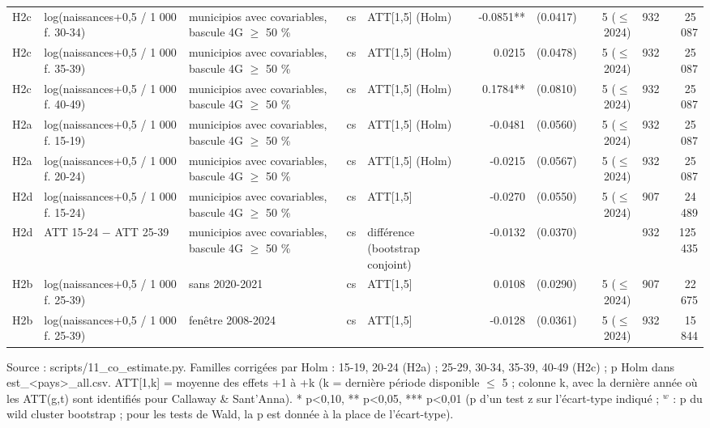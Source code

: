 \begin{table}
\begin{threeparttable}
\begin{tabular}{lp{4.7cm}p{5.1cm}lp{4.2cm}rrrrr}
H2c & log(naissances+0,5 / 1 000 f. 30-34) & municipios avec covariables, bascule 4G $\geq$ 50 \% & cs & ATT[1,5] (Holm) & -0.0851** & (0.0417) & 5 ($\leq$ 2024) & 932 & 25\,087 \\
H2c & log(naissances+0,5 / 1 000 f. 35-39) & municipios avec covariables, bascule 4G $\geq$ 50 \% & cs & ATT[1,5] (Holm) & 0.0215 & (0.0478) & 5 ($\leq$ 2024) & 932 & 25\,087 \\
H2c & log(naissances+0,5 / 1 000 f. 40-49) & municipios avec covariables, bascule 4G $\geq$ 50 \% & cs & ATT[1,5] (Holm) & 0.1784** & (0.0810) & 5 ($\leq$ 2024) & 932 & 25\,087 \\
H2a & log(naissances+0,5 / 1 000 f. 15-19) & municipios avec covariables, bascule 4G $\geq$ 50 \% & cs & ATT[1,5] (Holm) & -0.0481 & (0.0560) & 5 ($\leq$ 2024) & 932 & 25\,087 \\
H2a & log(naissances+0,5 / 1 000 f. 20-24) & municipios avec covariables, bascule 4G $\geq$ 50 \% & cs & ATT[1,5] (Holm) & -0.0215 & (0.0567) & 5 ($\leq$ 2024) & 932 & 25\,087 \\
H2d & log(naissances+0,5 / 1 000 f. 15-24) & municipios avec covariables, bascule 4G $\geq$ 50 \% & cs & ATT[1,5] & -0.0270 & (0.0550) & 5 ($\leq$ 2024) & 907 & 24\,489 \\
H2d & ATT 15-24 $-$ ATT 25-39 & municipios avec covariables, bascule 4G $\geq$ 50 \% & cs & différence (bootstrap conjoint) & -0.0132 & (0.0370) &  & 932 & 125\,435 \\
H2b & log(naissances+0,5 / 1 000 f. 25-39) & sans 2020-2021 & cs & ATT[1,5] & 0.0108 & (0.0290) & 5 ($\leq$ 2024) & 907 & 22\,675 \\
H2b & log(naissances+0,5 / 1 000 f. 25-39) & fenêtre 2008-2024 & cs & ATT[1,5] & -0.0128 & (0.0361) & 5 ($\leq$ 2024) & 932 & 15\,844 \\
\bottomrule
\end{tabular}
\begin{tablenotes}\footnotesize
\item Source : scripts/11\_co\_estimate.py. Familles corrigées par Holm : 15-19, 20-24 (H2a) ; 25-29, 30-34, 35-39, 40-49 (H2c) ; p Holm dans est\_<pays>\_all.csv. ATT[1,k] = moyenne des effets +1 à +k (k = dernière période disponible $\leq$ 5 ; colonne k, avec la dernière année où les ATT(g,t) sont identifiés pour Callaway \& Sant'Anna). * p<0,10, ** p<0,05, *** p<0,01 (p d'un test z sur l'écart-type indiqué ; $^{w}$ : p du wild cluster bootstrap ; pour les tests de Wald, la p est donnée à la place de l'écart-type).
\end{tablenotes}
\end{threeparttable}
\end{table}

